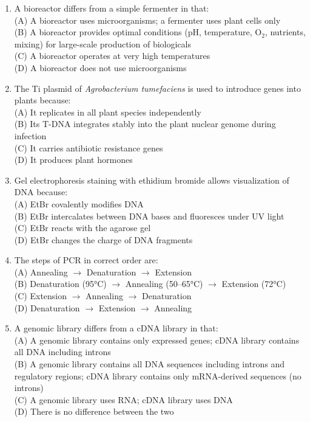 \documentclass{article}
\begin{document}
\begin{enumerate}[label=Q\arabic*.]
\item A bioreactor differs from a simple fermenter in that:
\\(A) A bioreactor uses microorganisms; a fermenter uses plant cells only
\\(B) A bioreactor provides optimal conditions (pH, temperature, O$_2$, nutrients, mixing) for large-scale production of biologicals
\\(C) A bioreactor operates at very high temperatures
\\(D) A bioreactor does not use microorganisms

\item The Ti plasmid of \textit{Agrobacterium tumefaciens} is used to introduce genes into plants because:
\\(A) It replicates in all plant species independently
\\(B) Its T-DNA integrates stably into the plant nuclear genome during infection
\\(C) It carries antibiotic resistance genes
\\(D) It produces plant hormones

\item Gel electrophoresis staining with ethidium bromide allows visualization of DNA because:
\\(A) EtBr covalently modifies DNA
\\(B) EtBr intercalates between DNA bases and fluoresces under UV light
\\(C) EtBr reacts with the agarose gel
\\(D) EtBr changes the charge of DNA fragments

\item The steps of PCR in correct order are:
\\(A) Annealing $\rightarrow$ Denaturation $\rightarrow$ Extension
\\(B) Denaturation (95°C) $\rightarrow$ Annealing (50--65°C) $\rightarrow$ Extension (72°C)
\\(C) Extension $\rightarrow$ Annealing $\rightarrow$ Denaturation
\\(D) Denaturation $\rightarrow$ Extension $\rightarrow$ Annealing

\item A genomic library differs from a cDNA library in that:
\\(A) A genomic library contains only expressed genes; cDNA library contains all DNA including introns
\\(B) A genomic library contains all DNA sequences including introns and regulatory regions; cDNA library contains only mRNA-derived sequences (no introns)
\\(C) A genomic library uses RNA; cDNA library uses DNA
\\(D) There is no difference between the two


\end{enumerate}
\end{document}
